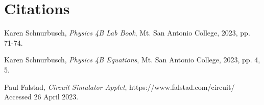 \documentclass[12pt]{iopart} %
\begin{document}
\section{Citations}

\begin{thebibliography}{9}

  Karen Schnurbusch,
  \textit{Physics 4B Lab Book},
  Mt. San Antonio College,
  2023,
  pp. 71-74.

  Karen Schnurbusch,
  \textit{Physics 4B Equations},
  Mt. San Antonio College,
  2023,
  pp. 4, 5.

  Paul Falstad,
  \textit{Circuit Simulator Applet},
  https://www.falstad.com/circuit/
  Accessed 26 April 2023.

\end{thebibliography}
\end{document}
